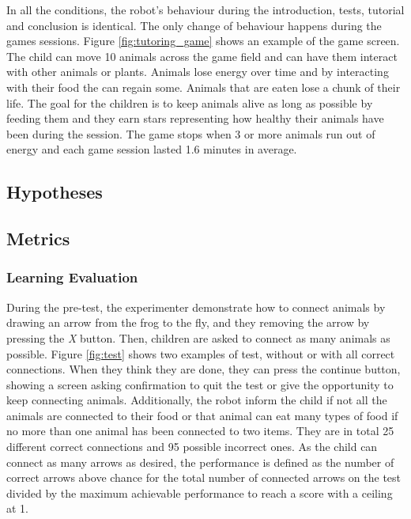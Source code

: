 In all the conditions, the robot's behaviour during the introduction, tests, tutorial and conclusion is identical. The only change of behaviour happens during the games sessions. Figure \ref{fig:tutoring_game} shows an example of the game screen. The child can move 10 animals across the game field and can have them interact with other animals or plants. Animals lose energy over time and by interacting with their food the can regain some. Animals that are eaten lose a chunk of their life. The goal for the children is to keep animals alive as long as possible by feeding them and they earn stars representing how healthy their animals have been during the session. The game stops when 3 or more animals run out of energy and each game session lasted 1.6 minutes in average.

\subsection{Hypotheses}

\subsection{Metrics}
\subsubsection{Learning Evaluation}
During the pre-test, the experimenter demonstrate how to connect animals by drawing an arrow from the frog to the fly, and they removing the arrow by pressing the \textit{X} button. Then, children are asked to connect as many animals as possible. Figure \ref{fig:test} shows two examples of test, without or with all correct connections. When they think they are done, they can press the continue button, showing a screen asking confirmation to quit the test or give the opportunity to keep connecting animals. Additionally, the robot inform the child if not all the animals are connected to their food or that animal can eat many types of food if no more than one animal has been connected to two items. They are in total 25 different correct connections and 95 possible incorrect ones. As the child can connect as many arrows as desired, the performance is defined as the number of correct arrows above chance for the total number of connected arrows on the test divided by the maximum achievable performance to reach a score with a ceiling at 1.

